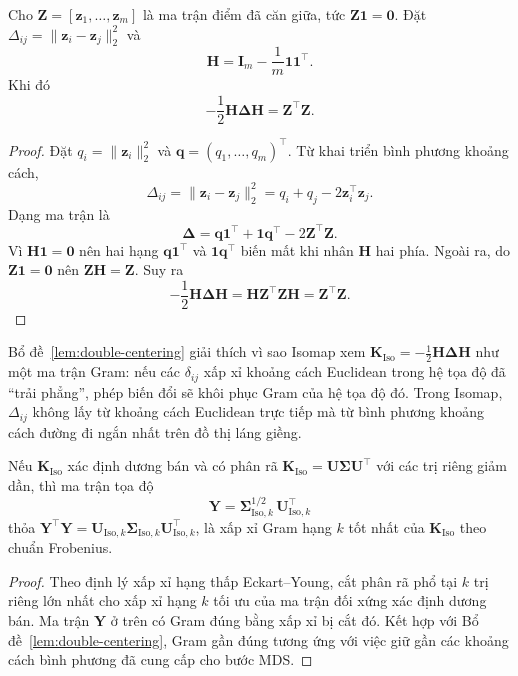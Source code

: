 \begin{lemma}
\label{lem:double-centering}
Cho $\mathbf{Z}=[\mathbf{z}_1,\ldots,\mathbf{z}_m]$ là ma trận điểm đã căn giữa, tức $\mathbf{Z}\mathbf{1}=\mathbf{0}$. Đặt $\Delta_{ij}=\|\mathbf{z}_i-\mathbf{z}_j\|_2^2$ và
\[
\mathbf{H}=\mathbf{I}_m-\frac{1}{m}\mathbf{1}\mathbf{1}^\top.
\]
Khi đó
\[
-\frac{1}{2}\mathbf{H}\boldsymbol{\Delta}\mathbf{H}=\mathbf{Z}^\top\mathbf{Z}.
\]
\end{lemma}

\begin{proof}
Đặt $q_i=\|\mathbf{z}_i\|_2^2$ và $\mathbf{q}=(q_1,\ldots,q_m)^\top$. Từ khai triển bình phương khoảng cách,
\[
\Delta_{ij}=\|\mathbf{z}_i-\mathbf{z}_j\|_2^2=q_i+q_j-2\mathbf{z}_i^\top\mathbf{z}_j.
\]
Dạng ma trận là
\[
\boldsymbol{\Delta}=\mathbf{q}\mathbf{1}^\top+\mathbf{1}\mathbf{q}^\top-2\mathbf{Z}^\top\mathbf{Z}.
\]
Vì $\mathbf{H}\mathbf{1}=\mathbf{0}$ nên hai hạng $\mathbf{q}\mathbf{1}^\top$ và $\mathbf{1}\mathbf{q}^\top$ biến mất khi nhân $\mathbf{H}$ hai phía. Ngoài ra, do $\mathbf{Z}\mathbf{1}=\mathbf{0}$ nên $\mathbf{Z}\mathbf{H}=\mathbf{Z}$. Suy ra
\[
-\frac{1}{2}\mathbf{H}\boldsymbol{\Delta}\mathbf{H}=\mathbf{H}\mathbf{Z}^\top\mathbf{Z}\mathbf{H}=\mathbf{Z}^\top\mathbf{Z}.
\]
\end{proof}

Bổ đề~\ref{lem:double-centering} giải thích vì sao Isomap xem $\mathbf{K}_{\mathrm{Iso}}=-\frac{1}{2}\mathbf{H}\boldsymbol{\Delta}\mathbf{H}$ như một ma trận Gram: nếu các $\delta_{ij}$ xấp xỉ khoảng cách Euclidean trong hệ tọa độ đã ``trải phẳng'', phép biến đổi sẽ khôi phục Gram của hệ tọa độ đó. Trong Isomap, $\Delta_{ij}$ không lấy từ khoảng cách Euclidean trực tiếp mà từ bình phương khoảng cách đường đi ngắn nhất trên đồ thị láng giềng.

\begin{lemma}
\label{lem:isomap-spectral}
Nếu $\mathbf{K}_{\mathrm{Iso}}$ xác định dương bán và có phân rã $\mathbf{K}_{\mathrm{Iso}} = \mathbf{U}\boldsymbol{\Sigma}\mathbf{U}^\top$ với các trị riêng giảm dần, thì ma trận tọa độ
\[
\mathbf{Y} = \boldsymbol{\Sigma}_{\mathrm{Iso},k}^{1/2}\,\mathbf{U}_{\mathrm{Iso},k}^\top
\]
thỏa $\mathbf{Y}^\top\mathbf{Y} = \mathbf{U}_{\mathrm{Iso},k}\boldsymbol{\Sigma}_{\mathrm{Iso},k}\mathbf{U}_{\mathrm{Iso},k}^\top$, là xấp xỉ Gram hạng $k$ tốt nhất của $\mathbf{K}_{\mathrm{Iso}}$ theo chuẩn Frobenius.
\end{lemma}

\begin{proof}
Theo định lý xấp xỉ hạng thấp Eckart--Young, cắt phân rã phổ tại $k$ trị riêng lớn nhất cho xấp xỉ hạng $k$ tối ưu của ma trận đối xứng xác định dương bán. Ma trận $\mathbf{Y}$ ở trên có Gram đúng bằng xấp xỉ bị cắt đó. Kết hợp với Bổ đề~\ref{lem:double-centering}, Gram gần đúng tương ứng với việc giữ gần các khoảng cách bình phương đã cung cấp cho bước MDS.
\end{proof}

